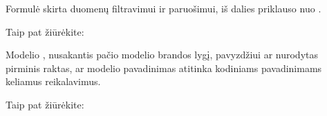 \documentclass[letterpaper,10pt,lithuanian]{sphinxmanual}
\begin{document}
\begin{fulllineitems}
\label{\detokenize{dimensijos:model.prepare}}
\pysigstartsignatures
{}
\pysigstopsignatures
\sphinxAtStartPar
Formulė skirta duomenų filtravimui ir paruošimui, iš dalies priklauso nuo
{\hyperref[\detokenize{dimensijos:resource.type}]{}}.


\begin{sphinxseealso}{Taip pat žiūrėkite:}

\begin{DUlineblock}{0em}
\item[] {\hyperref[\detokenize{formules:formules}]{}}
\item[] {\hyperref[\detokenize{formules:duomenu-atranka}]{}}
\end{DUlineblock}


\end{sphinxseealso}


\end{fulllineitems}


\begin{fulllineitems}
\label{\detokenize{dimensijos:model.level}}
\pysigstartsignatures
{}
\pysigstopsignatures
\sphinxAtStartPar
Modelio {\hyperref[\detokenize{branda:level}]{}}, nusakantis pačio modelio brandos
lygį, pavyzdžiui ar nurodytas pirminis raktas, ar modelio pavadinimas
atitinka kodiniams pavadinimams keliamus reikalavimus.


\begin{sphinxseealso}{Taip pat žiūrėkite:}

\sphinxAtStartPar
{\hyperref[\detokenize{identifikatoriai:ref-level}]{}}


\end{sphinxseealso}


\end{fulllineitems}

\end{document}
